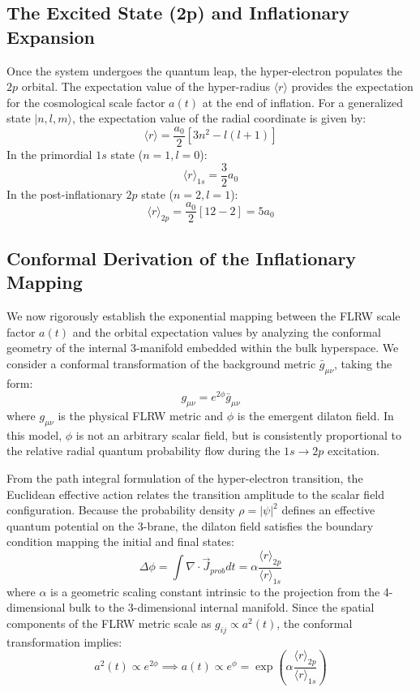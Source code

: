 \subsection{The Excited State (2p) and Inflationary Expansion}
Once the system undergoes the quantum leap, the hyper-electron populates the $2p$ orbital. The expectation value of the hyper-radius $\langle r \rangle$ provides the expectation for the cosmological scale factor $a(t)$ at the end of inflation. 
For a generalized state $|n, l, m\rangle$, the expectation value of the radial coordinate is given by:
\begin{equation}
\langle r \rangle = \frac{a_0}{2} \left[ 3n^2 - l(l+1) \right]
\end{equation}
In the primordial $1s$ state ($n=1, l=0$):
\begin{equation}
\langle r \rangle_{1s} = \frac{3}{2} a_0
\end{equation}
In the post-inflationary $2p$ state ($n=2, l=1$):
\begin{equation}
\langle r \rangle_{2p} = \frac{a_0}{2} [12 - 2] = 5 a_0
\end{equation}
\subsection{Conformal Derivation of the Inflationary Mapping}

We now rigorously establish the exponential mapping between the FLRW scale factor $a(t)$ and the orbital expectation values by analyzing the conformal geometry of the internal 3-manifold embedded within the bulk hyperspace. We consider a conformal transformation of the background metric $\bar{g}_{\mu\nu}$, taking the form:
\begin{equation}
g_{\mu\nu} = e^{2\phi}\bar{g}_{\mu\nu}
\end{equation}
where $g_{\mu\nu}$ is the physical FLRW metric and $\phi$ is the emergent dilaton field. In this model, $\phi$ is not an arbitrary scalar field, but is consistently proportional to the relative radial quantum probability flow during the $1s \rightarrow 2p$ excitation. 

From the path integral formulation of the hyper-electron transition, the Euclidean effective action relates the transition amplitude to the scalar field configuration. Because the probability density $\rho = |\psi|^2$ defines an effective quantum potential on the 3-brane, the dilaton field satisfies the boundary condition mapping the initial and final states:
\begin{equation}
\Delta\phi = \int \nabla \cdot \vec{J}_{prob} dt = \alpha \frac{\langle r \rangle_{2p}}{\langle r \rangle_{1s}}
\end{equation}
where $\alpha$ is a geometric scaling constant intrinsic to the projection from the 4-dimensional bulk to the 3-dimensional internal manifold. Since the spatial components of the FLRW metric scale as $g_{ij} \propto a^2(t)$, the conformal transformation implies:
\begin{equation}
a^2(t) \propto e^{2\phi} \implies a(t) \propto e^{\phi} = \exp\left(\alpha \frac{\langle r \rangle_{2p}}{\langle r \rangle_{1s}}\right)
\end{equation}

